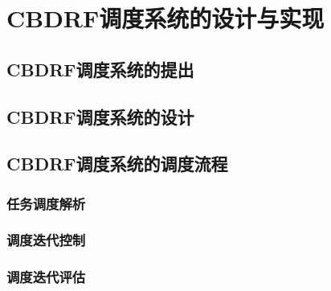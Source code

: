 
\chapter{CBDRF调度系统的设计与实现}
\label{cha:frontmatter}
\section{CBDRF调度系统的提出}
\section{CBDRF调度系统的设计}
\subsection{}
\subsection{}
\section{CBDRF调度系统的调度流程}
\subsection{任务调度解析}
\subsection{调度迭代控制}
\subsection{调度迭代评估}



